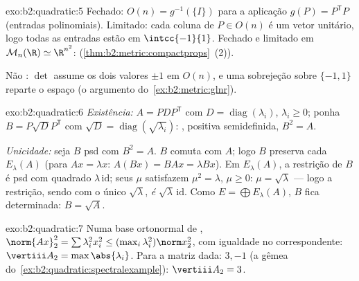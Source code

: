 \begin{solution}{exo:b2:quadratic:5}
Fechado: $O(n) = g^{-1}(\{I\})$ para a aplicação  $g(P) =
P^{\mathsf T}P$ (entradas polinomiais). Limitado: cada coluna de $P
\in O(n)$ é um vetor unitário, logo todas as entradas estão em $\intcc{-1}{1}$.
Fechado e limitado em $\mathcal{M}_n(\R) \simeq \R^{n^2}$: 
(\cref{thm:b2:metric:compactprops}~(2)).

Não : $\det$ assume os dois valores $\pm1$ em $O(n)$, e uma
sobrejeção  sobre $\{-1, 1\}$ reparte o espaço
(o argumento do~\cref{ex:b2:metric:glnr}).
\end{solution}

\begin{solution}{exo:b2:quadratic:6}
\emph{Existência:} $A = PDP^{\mathsf T}$ com $D =
\operatorname{diag}(\lambda_i)$, $\lambda_i \geq 0$; ponha $B =
P\sqrt D P^{\mathsf T}$ com $\sqrt D =
\operatorname{diag}(\sqrt{\lambda_i})$: , positiva
semidefinida, $B^2 = A$.

\emph{Unicidade:} seja $B$  psd com $B^2 = A$. $B$
comuta com $A$; logo $B$ preserva cada 
$E_\lambda(A)$ (para $Ax = \lambda x$: $A(Bx) = BAx = \lambda Bx$).
Em $E_\lambda(A)$, a restrição de $B$ é  psd com
quadrado $\lambda\,\mathrm{id}$; seus  $\mu$ satisfazem $\mu^2
= \lambda$, $\mu \geq 0$: $\mu = \sqrt\lambda$ --- logo a
restrição, sendo  com o único 
$\sqrt\lambda$, \emph{é} $\sqrt\lambda\,\mathrm{id}$. Como $E =
\bigoplus E_\lambda(A)$, $B$ fica determinada: $B = \sqrt A$.
\end{solution}

\begin{solution}{exo:b2:quadratic:7}
Numa base ortonormal de , $\norm{Ax}_2^2 = \sum \lambda_i^2
x_i^2 \leq (\max_i \lambda_i^2)\norm x_2^2$, com igualdade no
 correspondente: $\vertiii A_2 = \max\abs{\lambda_i}$.
Para a matriz dada:  $3, -1$
(a gêmea do~\cref{ex:b2:quadratic:spectralexample}):
$\vertiii A_2 = 3$.
\end{solution}


